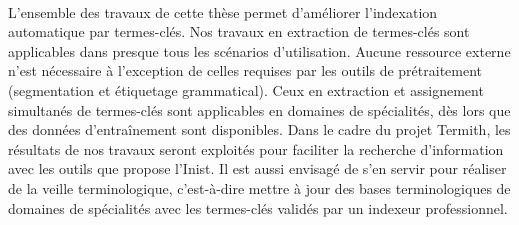     ~\\L'ensemble des travaux de cette thèse permet d'améliorer l'indexation
    automatique par termes-clés. Nos travaux en extraction de termes-clés sont
    applicables dans presque tous les scénarios d'utilisation. Aucune ressource
    externe n'est nécessaire à l'exception de celles requises par les outils de
    prétraitement (segmentation et étiquetage grammatical). Ceux en
    extraction et assignement simultanés de termes-clés sont applicables en
    domaines de spécialités, dès lors que des données d'entraînement sont
    disponibles. Dans le cadre du projet Termith, les résultats de nos travaux
    seront exploités pour faciliter la recherche d'information avec les outils
    que propose l'Inist. Il est aussi envisagé de s'en servir pour réaliser de
    la veille terminologique, c'est-à-dire mettre à jour des bases
    terminologiques de domaines de spécialités avec les termes-clés validés par
    un indexeur professionnel.


